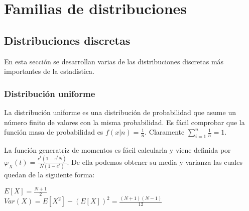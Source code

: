 \documentclass{article}
\newcommand{\importsection}[1]{}           %
\begin{document}
\hypersetup{pageanchor=false}
\maketitle
\hypersetup{pageanchor=true}


\setcounter{tocdepth}{2}

\newpage
\tableofcontents
\vspace*{\fill}
\doclicenseThis
\newpage


\importsection{Intro.tex}
\pagebreak

\section{Familias de distribuciones}

\subsection{Distribuciones discretas}

En esta sección se desarrollan varias de las distribuciones discretas más importantes de la estadística.

    \subsubsection{Distribución uniforme}
La distribución uniforme es una distribución de probabilidad que asume un número finito de valores con la misma probabilidad. Es fácil comprobar que la función masa de probabilidad es $f(x|n) = \frac{1}{n}$. Claramente $\sum^n_{i=1} \frac{1}{n} = 1$.

La función generatriz de momentos es fácil calcularla y viene definida por $\varphi_X(t) = \frac{e^t (1 - e^tN)}{N(1-e^t)}$. De ella podemos obtener su media y varianza las cuales quedan de la siguiente forma:

\begin{center}
	$E[X] = \frac{N+1}{2}$
	\\$Var(X) =  E[X^2] - (E[X])^2 =  \frac{(N+1)(N-1)}{12}$
\end{center}
\end{document}
